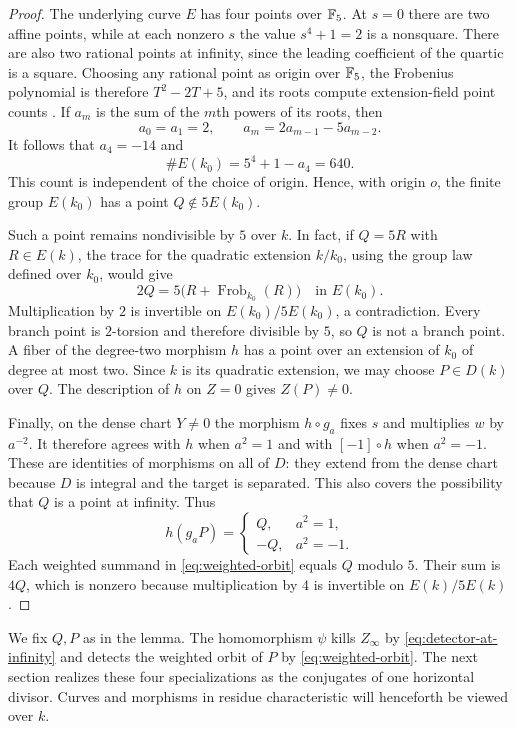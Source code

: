 \begin{proof}
The underlying curve $E$ has four points over $\mathbb F_5$. At $s=0$ there are two affine
points, while at each nonzero $s$ the value $s^4+1=2$ is a nonsquare.
There are also two rational points at infinity, since the leading
coefficient of the quartic is a square. Choosing any rational point as
origin over $\mathbb F_5$, the Frobenius polynomial is therefore
$T^2-2T+5$, and its roots compute extension-field point counts
\cite[Theorem~V.2.3.1]{Silverman2009}. If $a_m$ is the sum of the $m$th powers of its roots, then
\[
    a_0=a_1=2,\qquad a_m=2a_{m-1}-5a_{m-2}.
\]
It follows that $a_4=-14$ and
\[
    \#E(k_0)=5^4+1-a_4=640.
\]
This count is independent of the choice of origin. Hence, with origin
$o$, the finite group $E(k_0)$ has a point $Q\notin5E(k_0)$.

Such a point remains nondivisible by $5$ over $k$. In fact, if $Q=5R$
with $R\in E(k)$, the trace for the quadratic extension $k/k_0$, using
the group law defined over $k_0$, would give
\[
    2Q=5\bigl(R+\operatorname{Frob}_{k_0}(R)\bigr)
        \quad\text{in }E(k_0).
\]
Multiplication by $2$ is invertible on $E(k_0)/5E(k_0)$, a contradiction.
Every branch point is $2$-torsion and therefore divisible by $5$, so
$Q$ is not a branch point. A fiber of the degree-two morphism $h$ has a
point over an extension of $k_0$ of degree at most two. Since $k$ is its
quadratic extension, we may choose $P\in D(k)$ over $Q$. The description
of $h$ on $Z=0$ gives $Z(P)\ne0$.

Finally, on the dense chart $Y\ne0$ the morphism $h\circ g_a$
fixes $s$ and multiplies $w$ by $a^{-2}$. It therefore agrees with
$h$ when $a^2=1$ and with $[-1]\circ h$ when $a^2=-1$. These are
identities of morphisms on all of $D$: they extend from the dense
chart because $D$ is integral and the target is separated. This
also covers the possibility that $Q$ is a point at infinity. Thus
\[
    h(g_aP)=
    \begin{cases}
        Q,&a^2=1,\\
        -Q,&a^2=-1.
    \end{cases}
\]
Each weighted summand in \eqref{eq:weighted-orbit} equals $Q$ modulo
$5$. Their sum is $4Q$, which is nonzero because multiplication by $4$
is invertible on $E(k)/5E(k)$.
\end{proof}

We fix $Q,P$ as in the lemma. The homomorphism $\psi$ kills
$Z_\infty$ by \eqref{eq:detector-at-infinity} and detects the weighted
orbit of $P$ by \eqref{eq:weighted-orbit}. The next section realizes
these four specializations as the conjugates of one horizontal divisor.
Curves and morphisms in residue characteristic will henceforth be
viewed over $k$.

